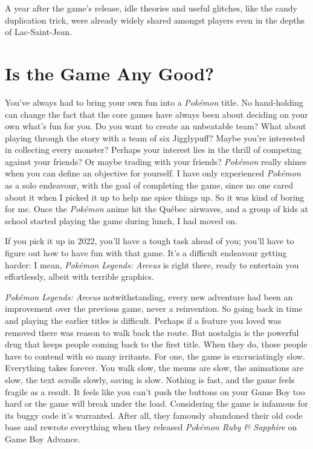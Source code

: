 \documentclass{book}
\begin{document}
A year after the game’s release, idle theories and useful glitches, like the candy duplication trick, were already widely shared amongst players even in the depths of Lac-Saint-Jean.\par
\FloatBarrier\section*{Is the Game Any Good?}
You’ve always had to bring your own fun into a \emph{Pokémon} title. No hand-holding can change the fact that the core games have always been about deciding on your own what’s fun for you. Do you want to create an unbeatable team? What about playing through the story with a team of six Jigglypuff? Maybe you’re interested in collecting every monster? Perhaps your interest lies in the thrill of competing against your friends? Or maybe trading with your friends? \emph{Pokémon} really shines when you can define an objective for yourself. I have only experienced \emph{Pokémon} as a solo endeavour, with the goal of completing the game, since no one cared about it when I picked it up to help me spice things up. So it was kind of boring for me. Once the \emph{Pokémon} anime hit the Québec airwaves, and a group of kids at school started playing the game during lunch, I had moved on.\par
If you pick it up in 2022, you’ll have a tough task ahead of you; you’ll have to figure out how to have fun with that game. It’s a difficult endeavour getting harder: I mean, \emph{Pokémon Legends: Arceus} is right there, ready to entertain you effortlessly, albeit with terrible graphics.\par
\emph{Pokémon Legends: Arceus} notwithstanding, every new adventure had been an improvement over the previous game, never a reinvention. So going back in time and playing the earlier titles is difficult. Perhaps if a feature you loved was removed there was reason to walk back the route. But nostalgia is the powerful drug that keeps people coming back to the first title. When they do, those people have to contend with so many irritants. For one, the game is excruciatingly slow. Everything takes forever. You walk slow, the menus are slow, the animations are slow, the text scrolls slowly, saving is slow. Nothing is fast, and the game feels fragile as a result. It feels like you can’t push the buttons on your Game Boy too hard or the game will break under the load. Considering the game is infamous for its buggy code it’s warranted. After all, they famously abandoned their old code base and rewrote everything when they released \emph{Pokémon Ruby \& Sapphire} on Game Boy Advance.\par
\end{document}
